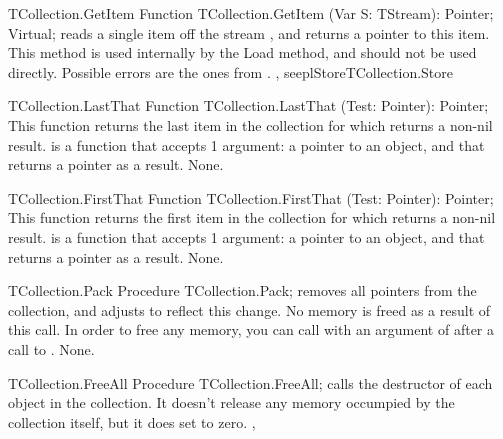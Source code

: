 \begin{function}{TCollection.GetItem}
\Declaration
Function TCollection.GetItem (Var S: TStream): Pointer; Virtual;
\Description
{} reads a single item off the stream , and
returns a pointer to this item. This method is used internally by the Load
method, and should not be used directly.
\Errors
Possible errors are the ones from .
\SeeAlso
{}, seepl{Store}{TCollection.Store}
\end{function}

\begin{function}{TCollection.LastThat}
\Declaration
Function TCollection.LastThat (Test: Pointer): Pointer;
\Description
This function returns the last item in the collection for which 
returns a non-nil result.  is a function that accepts 1 argument:
a pointer to an object, and that returns a pointer as a result.
\Errors
None.
\SeeAlso
{}
\end{function}

\html{}

\begin{function}{TCollection.FirstThat}
\Declaration
Function TCollection.FirstThat (Test: Pointer): Pointer;
\Description
This function returns the first item in the collection for which 
returns a non-nil result.  is a function that accepts 1 argument:
a pointer to an object, and that returns a pointer as a result.
\Errors
None.
\SeeAlso
{}
\end{function}

\html{}

\begin{procedure}{TCollection.Pack}
\Declaration
Procedure TCollection.Pack;
\Description
{} removes all  pointers from the collection, and adjusts
 to reflect this change. No memory is freed as a result of this
call. In order to free any memory, you can call  with an
argument of  after a call to .
\Errors
None.
\SeeAlso
{}
\end{procedure}


\begin{procedure}{TCollection.FreeAll}
\Declaration
Procedure TCollection.FreeAll;
\Description
{} calls the destructor of each object in the collection.
It doesn't release any memory occumpied by the collection itself, but it
does set  to zero.
\Errors
\SeeAlso
{}, 
\end{procedure}


